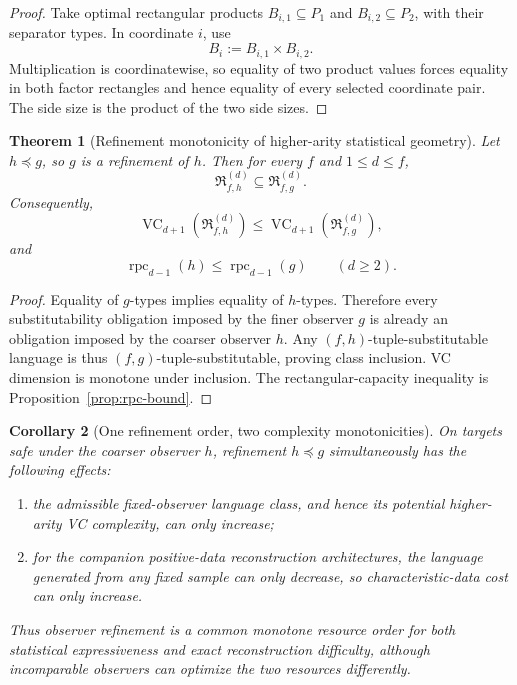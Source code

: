 \documentclass[11pt]{article}
\newtheorem{theorem}{Theorem}[section]
\newtheorem{corollary}[theorem]{Corollary}
\newcommand{\Rclass}{\mathfrak R}
\newcommand{\VC}{\operatorname{VC}}
\begin{document}
\begin{proof}
Take optimal rectangular products
\(B_{i,1}\subseteq P_1\) and \(B_{i,2}\subseteq P_2\), with their separator
types. In coordinate \(i\), use
\[
 B_i:=B_{i,1}\times B_{i,2}.
\]
Multiplication is coordinatewise, so equality of two product values forces
equality in both factor rectangles and hence equality of every selected
coordinate pair. The side size is the product of the two side sizes.
\end{proof}


\begin{theorem}[Refinement monotonicity of higher-arity statistical geometry]
\label{thm:vc-refinement}
Let \(h\preceq g\), so \(g\) is a refinement of \(h\). Then for every
\(f\) and \(1\le d\le f\),
\[
 \Rclass_{f,h}^{(d)}
 \subseteq
 \Rclass_{f,g}^{(d)}.
\]
Consequently,
\[
 \VC_{d+1}\!\left(\Rclass_{f,h}^{(d)}\right)
 \le
 \VC_{d+1}\!\left(\Rclass_{f,g}^{(d)}\right),
\]
and
\[
 \operatorname{rpc}_{d-1}(h)
 \le
 \operatorname{rpc}_{d-1}(g)
 \qquad(d\ge2).
\]
\end{theorem}

\begin{proof}
Equality of \(g\)-types implies equality of \(h\)-types.  Therefore every
substitutability obligation imposed by the finer observer \(g\) is already an
obligation imposed by the coarser observer \(h\).  Any
\((f,h)\)-tuple-substitutable language is thus
\((f,g)\)-tuple-substitutable, proving class inclusion.  VC dimension is
monotone under inclusion.  The rectangular-capacity inequality is
Proposition~\ref{prop:rpc-bound}.
\end{proof}

\begin{corollary}[One refinement order, two complexity monotonicities]
\label{cor:joint-refinement}
On targets safe under the coarser observer \(h\), refinement
\(h\preceq g\) simultaneously has the following effects:
\begin{enumerate}
\item the admissible fixed-observer language class, and hence its potential
higher-arity VC complexity, can only increase;
\item for the companion positive-data reconstruction architectures, the
language generated from any fixed sample can only decrease, so
characteristic-data cost can only increase.
\end{enumerate}
Thus observer refinement is a common monotone resource order for both
statistical expressiveness and exact reconstruction difficulty, although
incomparable observers can optimize the two resources differently.
\end{corollary}
\end{document}
